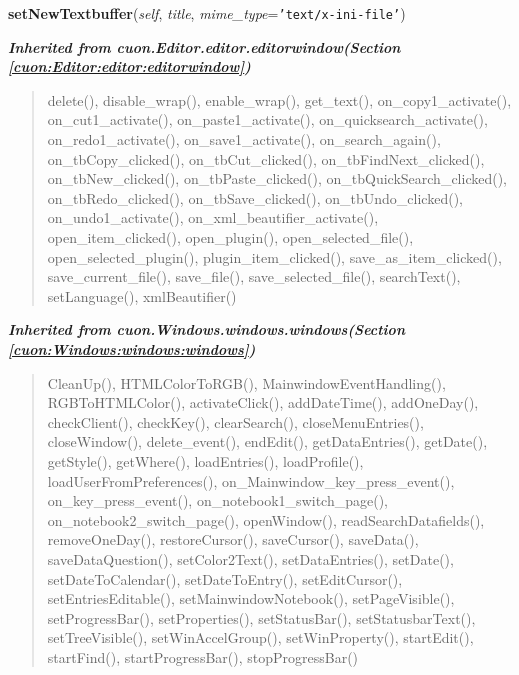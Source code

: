     \label{cuon:Editor:programmersEditor:programmerseditor:setNewTextbuffer}

    \vspace{0.5ex}

\hspace{.8\funcindent}\begin{boxedminipage}{\funcwidth}

    \raggedright \textbf{setNewTextbuffer}(\textit{self}, \textit{title}, \textit{mime\_type}={\tt \texttt{'}\texttt{text/x-ini-file}\texttt{'}})

\setlength{\parskip}{2ex}
\setlength{\parskip}{1ex}
    \end{boxedminipage}


\large{\textbf{\textit{Inherited from cuon.Editor.editor.editorwindow\textit{(Section \ref{cuon:Editor:editor:editorwindow})}}}}

\begin{quote}
delete(), disable\_wrap(), enable\_wrap(), get\_text(), on\_copy1\_activate(), on\_cut1\_activate(), on\_paste1\_activate(), on\_quicksearch\_activate(), on\_redo1\_activate(), on\_save1\_activate(), on\_search\_again(), on\_tbCopy\_clicked(), on\_tbCut\_clicked(), on\_tbFindNext\_clicked(), on\_tbNew\_clicked(), on\_tbPaste\_clicked(), on\_tbQuickSearch\_clicked(), on\_tbRedo\_clicked(), on\_tbSave\_clicked(), on\_tbUndo\_clicked(), on\_undo1\_activate(), on\_xml\_beautifier\_activate(), open\_item\_clicked(), open\_plugin(), open\_selected\_file(), open\_selected\_plugin(), plugin\_item\_clicked(), save\_as\_item\_clicked(), save\_current\_file(), save\_file(), save\_selected\_file(), searchText(), setLanguage(), xmlBeautifier()
\end{quote}

\large{\textbf{\textit{Inherited from cuon.Windows.windows.windows\textit{(Section \ref{cuon:Windows:windows:windows})}}}}

\begin{quote}
CleanUp(), HTMLColorToRGB(), MainwindowEventHandling(), RGBToHTMLColor(), activateClick(), addDateTime(), addOneDay(), checkClient(), checkKey(), clearSearch(), closeMenuEntries(), closeWindow(), delete\_event(), endEdit(), getDataEntries(), getDate(), getStyle(), getWhere(), loadEntries(), loadProfile(), loadUserFromPreferences(), on\_Mainwindow\_key\_press\_event(), on\_key\_press\_event(), on\_notebook1\_switch\_page(), on\_notebook2\_switch\_page(), openWindow(), readSearchDatafields(), removeOneDay(), restoreCursor(), saveCursor(), saveData(), saveDataQuestion(), setColor2Text(), setDataEntries(), setDate(), setDateToCalendar(), setDateToEntry(), setEditCursor(), setEntriesEditable(), setMainwindowNotebook(), setPageVisible(), setProgressBar(), setProperties(), setStatusBar(), setStatusbarText(), setTreeVisible(), setWinAccelGroup(), setWinProperty(), startEdit(), startFind(), startProgressBar(), stopProgressBar()
\end{quote}

